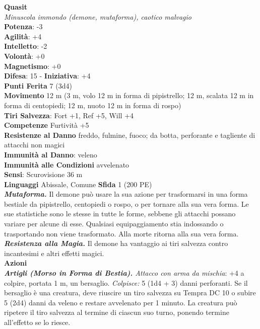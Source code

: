 \begin{multicols}{2}
\medskip\textbf{Quasit}\\
\emph{Minuscola immondo (demone, mutaforma), caotico malvagio}\\
\textbf{Potenza}: -3\\
\textbf{Agilità}: +4\\
\textbf{Intelletto}: -2\\
\textbf{Volontà}: +0\\
\textbf{Magnetismo}: +0\\
\textbf{Difesa}: 15 - \textbf{Iniziativa}: +4\\
\textbf{Punti Ferita} 7 (3d4)\\
\textbf{Movimento} 12 m (3 m, volo 12 m in forma di pipistrello; 12 m,
scalata 12 m in forma di centopiedi; 12 m, nuoto 12 m in forma di rospo)\\
\textbf{Tiri Salvezza}: Fort +1, Ref +5, Will +4\\
\textbf{Competenze} Furtività +5\\
\textbf{Resistenze al Danno} freddo, fulmine, fuoco; da botta, perforante e tagliente di attacchi non magici\\
\textbf{Immunità al Danno}: veleno\\
\textbf{Immunità alle Condizioni} avvelenato\\
\textbf{Sensi}: Scurovisione 36 m \\
\textbf{Linguaggi} Abissale, Comune 
\textbf{Sfida} 1 (200 PE)\smallskip\\
\emph{\textbf{Mutaforma.}} Il demone può usare la sua azione per trasformarsi in una forma bestiale da pipistrello, centopiedi o rospo, o per tornare alla sua vera forma. Le sue statistiche sono le stesse in tutte le forme, sebbene gli attacchi possano variare per alcune di esse. Qualsiasi equipaggiamento stia indossando o trasportando non viene trasformato. Alla morte ritorna alla sua vera forma.\\
\emph{\textbf{Resistenza alla Magia.}} Il demone ha vantaggio ai tiri salvezza contro incantesimi e altri effetti magici.\\
\smallskip\textbf{Azioni}\\
\emph{\textbf{Artigli (Morso in Forma di Bestia).} Attacco con arma da mischia}: +4 a colpire, portata 1 m, un bersaglio. \emph{Colpisce:} 5 (1d4 + 3) danni perforanti. Se il bersaglio è una creatura, deve riuscire un tiro salvezza su Tempra DC 10 o subire 5 (2d4) danni da veleno e restare avvelenato per 1 minuto. La creatura può ripetere il tiro salvezza al termine di ciascun suo turno, ponendo termine all'effetto se lo riesce.\\

\end{multicols}
